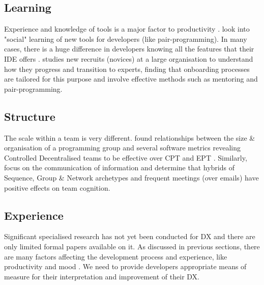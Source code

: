 \documentclass{prrcs}
\begin{document}
\subsection*{Learning}

Experience and knowledge of tools is a major factor to productivity \cite{gillProductivityImpactsSoftware1990,deomeloInterpretativeCaseStudies2013,maxwellBenchmarkingSoftwareDevelopmentProductivity2000,oliveiraSoftwareProjectManagers2016}. \textcite{cockburnCostsBenefitsPair2001,murphy-hillHowUsersDiscover2015} look into "social" learning of new tools for developers (like pair-programming). In many cases, there is a huge difference in developers knowing all the features that their IDE offers \cite{campbellDesigningRefactoringTools2008}. \textcite{begelNoviceSoftwareDevelopers2008} studies new recruits (novices) at a large organisation to understand how they progress and transition to experts, finding that onboarding processes are tailored for this purpose and involve effective methods such as mentoring and pair-programming.

\subsection*{Structure}

The scale within a team is very different. \textcite{basili1979investigation,manteiEffectProgrammingTeam1981} found relationships between the size \& organisation of a programming group and several software metrics revealing Controlled Decentralised teams to be effective over CPT \cite{mills1971chief,bakerChiefProgrammerTeam1972} and EPT \cite{weinbergPsychologyComputerProgramming1988}. Similarly, \textcite{sawyerSoftwareDevelopmentTeams2004, heTeamCognitionDevelopment2007} focus on the communication of information and determine that hybrids of Sequence, Group \& Network archetypes and frequent meetings (over emails) have positive effects on team cognition.

\subsection*{Experience}

Significant specialised research has not yet been conducted for DX and there are only limited formal papers available on it. As discussed in previous sections, there are many factors affecting the development process and experience, like productivity and mood \cite{WhyDoesProductivity,beechamMotivationSoftwareEngineering2008,graziotinFeelingsMatterCorrelation2015,amabileProgressPrincipleUsing2011,meyerSoftwareDevelopersPerceptions2014,mullerStuckFrustratedFlow2015,khanMoodsAffectProgrammers2011}. We need to provide developers appropriate means of measure for their interpretation and improvement of their DX.
\end{document}
